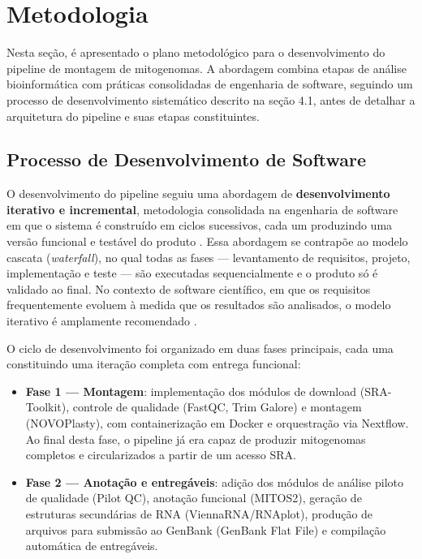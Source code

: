
\chapter{Metodologia}
\label{cap:metodologia}

Nesta seção, é apresentado o plano metodológico para o desenvolvimento do pipeline de montagem de mitogenomas. A abordagem combina etapas de análise bioinformática com práticas consolidadas de engenharia de software, seguindo um processo de desenvolvimento sistemático descrito na seção 4.1, antes de detalhar a arquitetura do pipeline e suas etapas constituintes.

\section{Processo de Desenvolvimento de Software}

O desenvolvimento do pipeline seguiu uma abordagem de \textbf{desenvolvimento iterativo e incremental}, metodologia consolidada na engenharia de software em que o sistema é construído em ciclos sucessivos, cada um produzindo uma versão funcional e testável do produto \cite{larman2003}. Essa abordagem se contrapõe ao modelo cascata (\textit{waterfall}), no qual todas as fases --- levantamento de requisitos, projeto, implementação e teste --- são executadas sequencialmente e o produto só é validado ao final. No contexto de software científico, em que os requisitos frequentemente evoluem à medida que os resultados são analisados, o modelo iterativo é amplamente recomendado \cite{wilson2014}.

O ciclo de desenvolvimento foi organizado em duas fases principais, cada uma constituindo uma iteração completa com entrega funcional:

\begin{itemize}
    \item \textbf{Fase 1 --- Montagem}: implementação dos módulos de download (SRA-Toolkit), controle de qualidade (FastQC, Trim Galore) e montagem (NOVOPlasty), com containerização em Docker e orquestração via Nextflow. Ao final desta fase, o pipeline já era capaz de produzir mitogenomas completos e circularizados a partir de um acesso SRA.
    \item \textbf{Fase 2 --- Anotação e entregáveis}: adição dos módulos de análise piloto de qualidade (Pilot QC), anotação funcional (MITOS2), geração de estruturas secundárias de RNA (ViennaRNA/RNAplot), produção de arquivos para submissão ao GenBank (GenBank Flat File) e compilação automática de entregáveis.
\end{itemize}

